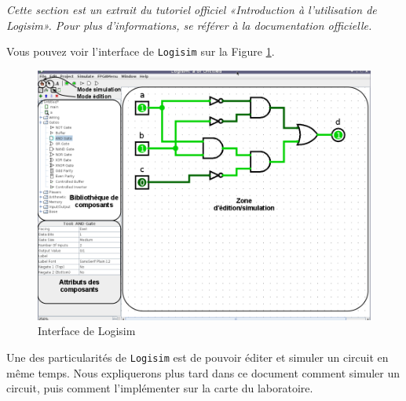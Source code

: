 \documentclass{article}
\begin{document}
    \textit{Cette section est un extrait du tutoriel officiel «Introduction à l’utilisation de Logisim». Pour plus d'informations, se référer à la documentation officielle.}

    Vous pouvez voir l'interface de \texttt{Logisim} sur la Figure  \ref{fig_logisim_description}.

    \begin{figure}[t]
        \begin{center}
            \includegraphics[width=500pt]{pictures/Logisim_description.png}
            \caption{\label{fig_logisim_description}Interface de Logisim}
        \end{center}
    \end{figure}

    Une des particularités de \texttt{Logisim} est de pouvoir éditer et simuler un circuit en même temps.
    Nous expliquerons plus tard dans ce document comment simuler un circuit, puis comment l'implémenter sur la carte du
    laboratoire.


\end{document}
